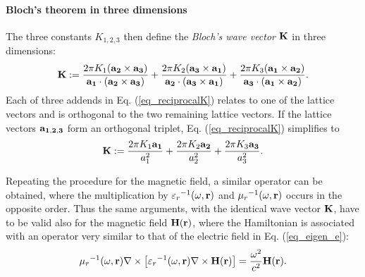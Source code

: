 \paragraph{Bloch's theorem in three dimensions} %
The three constants $K_{1,2,3}$ then define the \textit{Bloch's wave vector} ${\mathbf{K}}$ in three dimensions: 
\begin{equation} {\mathbf{K}} := 
\frac{2\pi K_1({\mathbf{a_2}}\times{\mathbf{a_3}})}{{\mathbf{a_1}}\cdot({\mathbf{a_2}}\times{\mathbf{a_3}})} +  
\frac{2\pi K_2({\mathbf{a_3}}\times{\mathbf{a_1}})}{{\mathbf{a_2}}\cdot({\mathbf{a_3}}\times{\mathbf{a_1}})} +  
\frac{2\pi K_3({\mathbf{a_1}}\times{\mathbf{a_2}})}{{\mathbf{a_3}}\cdot({\mathbf{a_1}}\times{\mathbf{a_2}})}.
\label{eq_reciprocalK}\end{equation}
Each of three addends in Eq. (\ref{eq_reciprocalK}) relates to one of the lattice vectors and is orthogonal to the two remaining lattice vectors. %
If the lattice vectors ${\mathbf{a_{1,2,3}}}$ form an orthogonal triplet, Eq. (\ref{eq_reciprocalK}) simplifies to
\begin{equation} {\mathbf{K}} := 
	\frac{2\pi K_1 {\mathbf{a_1}}}{a_1^{2}} +  
	\frac{2\pi K_2 {\mathbf{a_2}}}{a_2^{2}} +  
	\frac{2\pi K_3 {\mathbf{a_3}}}{a_3^{2}}.
\label{eq_reciprocalKorto}\end{equation}

Repeating the procedure for the magnetic field, a similar operator can be obtained, where the multiplication by ${\varepsilon_r}^{-1}(\omega,{\mathbf{r}})$ and ${\mu_r}^{-1 }(\omega,{\mathbf{r}})$ occurs in the opposite order. Thus the same arguments, with the identical wave vector ${\mathbf{K}}$, have to be valid also for the magnetic field $\mathbf{H}({\mathbf{r}})$, where the Hamiltonian is associated with an operator very similar to that of the electric field in Eq. (\ref{eq_eigen_e}):
\begin{equation}
{\mu_r}^{-1 }(\omega,{\mathbf{r}}) \nabla\times \left[{\varepsilon_r}^{-1}(\omega,{\mathbf{r}}) \nabla\times \mathbf{H}({\mathbf{r}})\right] = \frac{\omega^2}{c^2}\mathbf{H}({\mathbf{r}}).   \label{eq_eigen_h}
\end{equation}

